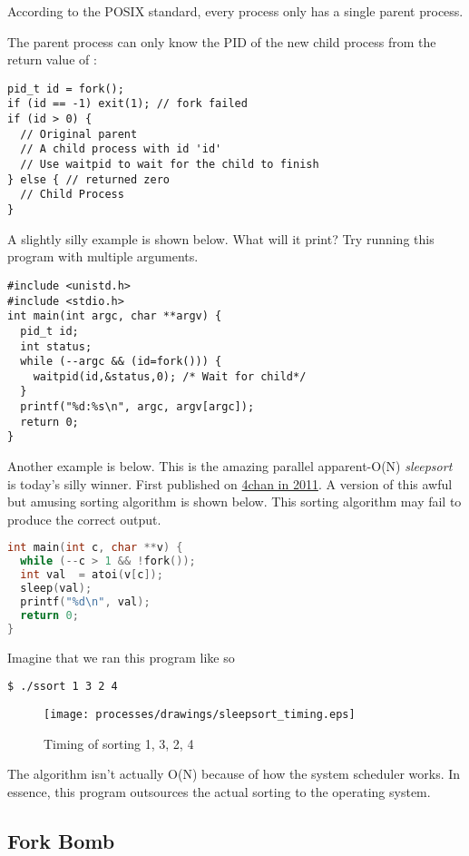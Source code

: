According to the POSIX standard, every process only has a single parent process.

The parent process can only know the PID of the new child process from the return value of :

\begin{verbatim}
pid_t id = fork();
if (id == -1) exit(1); // fork failed
if (id > 0) {
  // Original parent
  // A child process with id 'id'
  // Use waitpid to wait for the child to finish
} else { // returned zero
  // Child Process
}
\end{verbatim}

A slightly silly example is shown below.
What will it print?
Try running this program with multiple arguments.

\begin{verbatim}
#include <unistd.h>
#include <stdio.h>
int main(int argc, char **argv) {
  pid_t id;
  int status;
  while (--argc && (id=fork())) {
    waitpid(id,&status,0); /* Wait for child*/
  }
  printf("%d:%s\n", argc, argv[argc]);
  return 0;
}
\end{verbatim}

Another example is below.
This is the amazing parallel apparent-O(N) \emph{sleepsort} is today's silly winner.
First published on \href{https://dis.4chan.org/read/prog/1295544154}{4chan in 2011}.
A version of this awful but amusing sorting algorithm is shown below.
This sorting algorithm may fail to produce the correct output.

\begin{lstlisting}[language=C]
int main(int c, char **v) {
  while (--c > 1 && !fork());
  int val  = atoi(v[c]);
  sleep(val);
  printf("%d\n", val);
  return 0;
}
\end{lstlisting}

Imagine that we ran this program like so

\begin{lstlisting}
$ ./ssort 1 3 2 4
\end{lstlisting}

\begin{figure}[H]
\centering
\texttt{[image: processes/drawings/sleepsort\_timing.eps]}
\caption{Timing of sorting 1, 3, 2, 4}
\end{figure}

The algorithm isn't actually O(N) because of how the system scheduler works.
In essence, this program outsources the actual sorting to the operating system.

\subsection{Fork Bomb}

